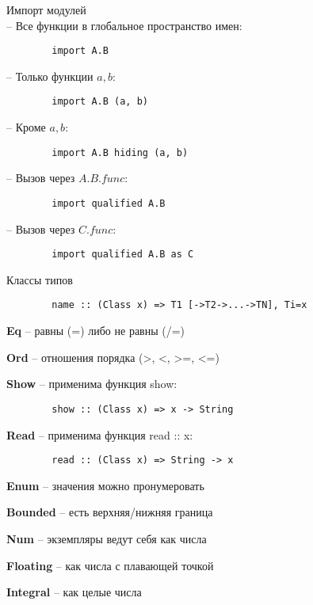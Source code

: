 \documentclass{article}
\begin{document}
    \large{Импорт модулей}\small\\
    
    -- Все функции в глобальное пространство имен:
    \begin{verbatim}
        import A.B
    \end{verbatim}
    
    -- Только функции $a, b$:
    \begin{verbatim}
        import A.B (a, b)
    \end{verbatim}
    
    -- Кроме $a, b$:
    \begin{verbatim}
        import A.B hiding (a, b)
    \end{verbatim}
    
    -- Вызов через $A.B.func$:
    \begin{verbatim}
        import qualified A.B
    \end{verbatim}    
    
    -- Вызов через $C.func$:
    \begin{verbatim}
        import qualified A.B as C
    \end{verbatim}        
    
    \large{Классы типов}\small\\    

    \begin{verbatim}
        name :: (Class x) => T1 [->T2->...->TN], Ti=x
    \end{verbatim}
    
    \textbf{Eq} -- равны (=) либо не равны (/=)
    
    \textbf{Ord} -- отношения порядка (>, <, >=, <=)
    
    \textbf{Show} -- применима функция show:
    \begin{verbatim}
        show :: (Class x) => x -> String
    \end{verbatim}    
    
    \textbf{Read} -- применима функция read :: x:
    \begin{verbatim}
        read :: (Class x) => String -> x
    \end{verbatim}
    
    \textbf{Enum} -- значения можно пронумеровать
    
    \textbf{Bounded} -- есть верхняя/нижняя граница
    
    \textbf{Num} -- экземпляры ведут себя как числа
    
    \textbf{Floating} -- как числа с плавающей точкой
    
    \textbf{Integral} -- как целые числа
    
    
    
    
 
\end{document}
